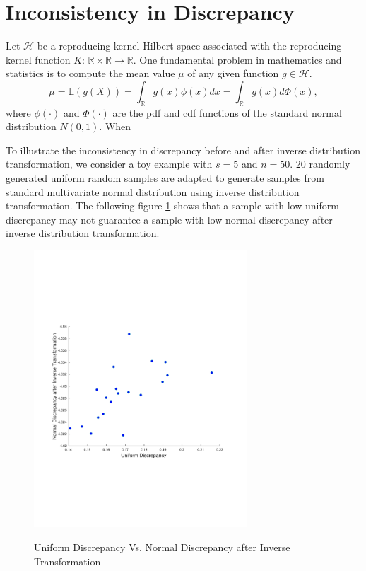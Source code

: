 \documentclass[graybox]{svmult}
\begin{document}
\section{Inconsistency in Discrepancy}\label{sec:inconsistency}

Let $\mathcal{H}$ be a reproducing kernel Hilbert space associated with the reproducing kernel function $K$: $\mathbb{R}\times \mathbb{R}\rightarrow\mathbb{R}$. 
One fundamental problem in mathematics and statistics is to compute the mean value $\mu$ of any given function $g\in \mathcal{H}$. 
\[
\mu=\mathbb{E}(g(X))=\int_{\mathbb{R}}g(x)\phi(x)dx=\int_{\mathbb{R}} g(x)d\Phi(x), 
\]
where $\phi(\cdot)$ and $\Phi(\cdot)$ are the pdf and cdf functions of the standard normal distribution $N(0,1)$. 
When 

To illustrate the inconsistency in discrepancy before and after inverse distribution transformation, we consider a toy example with $s=5$ and $n=50$. 20 randomly generated uniform random samples are adapted to generate samples from standard multivariate normal distribution using inverse distribution transformation. The following figure \ref{fig:UniVsNormDisc} shows that a sample with low uniform discrepancy may not guarantee a sample with low normal discrepancy after inverse distribution transformation.

\begin{figure}[H]
\label{fig:UniVsNormDisc}
\centering
{\includegraphics[width=8cm]{d5n50UniVsNormDisc2.pdf}}
\caption{Uniform Discrepancy Vs. Normal Discrepancy after Inverse Transformation}
\end{figure}
\end{document}
